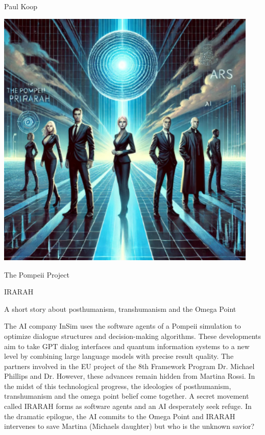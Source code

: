\documentclass[
]{article}
\author{}
\date{}
\begin{document}
Paul Koop

\includegraphics[width=4.92849in,height=4.92031in]{media/image17.png}

The Pompeii Project

IRARAH

A short story about posthumanism, transhumanism and the Omega Point

The AI \hspace{0pt}\hspace{0pt}company InSim uses the software agents of
a Pompeii simulation to optimize dialogue structures and decision-making
algorithms. These developments aim to take GPT dialog interfaces and
quantum information systems to a new level by combining large language
models with precise result quality. The partners involved in the EU
project of the 8th Framework Program Dr. Michael Phillips and Dr.
However, these advances remain hidden from Martina Rossi. In the midst
of this technological progress, the ideologies of posthumanism,
transhumanism and the omega point belief come together. A secret
movement called IRARAH forms as software agents and an AI desperately
seek refuge. In the dramatic epilogue, the AI
\hspace{0pt}\hspace{0pt}commits to the Omega Point and IRARAH intervenes
to save Martina (Michael\textquotesingle s daughter) but who is the
unknown savior?
\end{document}
